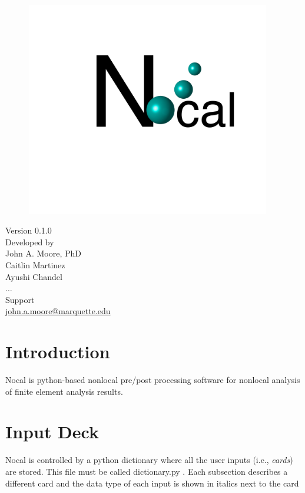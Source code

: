 \documentclass[11pt]{article}
\newcommand{\inputDeckName}{dictionary.py }
\begin{document}
 
\begin{figure}[ht!]
\centering
\includegraphics[trim={10cm 10cm 4cm 0cm},clip,  width=0.95\textwidth]{nocal.png}
\end{figure}
{\centering  Version 0.1.0 \\
Developed by \\
John A. Moore, PhD \\
Caitlin Martinez \\
Ayushi Chandel  \\
$\hdots$ \\
Support\\
\url{john.a.moore@marquette.edu}\\
}
\section{Introduction}
Nocal is python-based nonlocal pre/post processing software for nonlocal analysis of finite element analysis results. 
\section{Input Deck}
Nocal is controlled by a python dictionary where all the user inputs (i.e., \emph{cards}) are stored. This file must be called \inputDeckName. Each subsection describes a different card and the data type of each input is shown in italics next to the card
\end{document}
